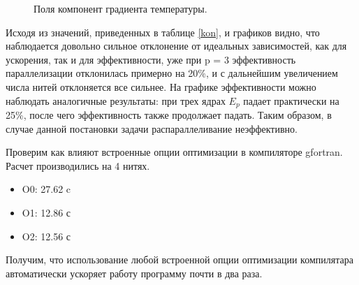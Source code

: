 \begin{figure}[H]
    \centering
    \caption{Поля компонент градиента температуры.}
    \label{fig:last}
\end{figure}

Исходя из значений, приведенных в таблице \ref{kon}, и графиков видно, что
наблюдается довольно сильное отклонение от идеальных зависимостей, как для ускорения,
так и для эффективности, уже при p = 3 эффективность параллелизации отклонилась
примерно на 20\%, и с дальнейшим увеличением числа нитей отклоняется все сильнее. На графике эффективности можно наблюдать аналогичные
результаты: при трех ядрах $E_p$ падает практически на 25\%, после чего
эффективность также продолжает падать. Таким образом, в случае данной
постановки задачи распараллеливание неэффективно.

Проверим как влияют встроенные опции оптимизации в компиляторе gfortran. Расчет производились на 4 нитях.
\begin{itemize}
    \item O0: 27.62 c
    \item O1: 12.86 с
    \item O2: 12.56 с
\end{itemize}

Получим, что использование любой встроенной опции оптимизации компилятара автоматически ускоряет работу программу почти в два раза.

